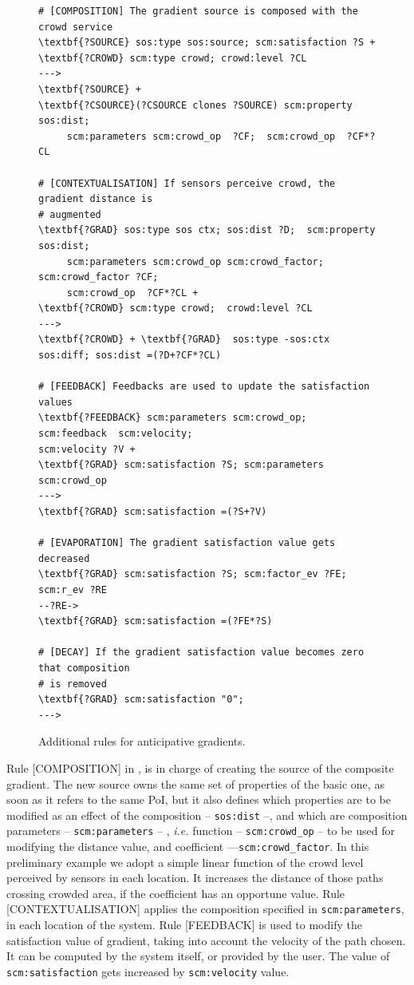 \documentclass[12pt,a4paper,twoside,openright]{book}
\begin{document}
\begin{figure}[t!]\vspace{10pt}
{\footnotesize \begin{Verbatim}[frame=single, commandchars=\\\{\}, label={\small \bf Eco-laws for gradient contextualisation}]
# [COMPOSITION] The gradient source is composed with the crowd service
\textbf{?SOURCE} sos:type sos:source; scm:satisfaction ?S +
\textbf{?CROWD} scm:type crowd; crowd:level ?CL 
---> 
\textbf{?SOURCE} +
\textbf{?CSOURCE}(?CSOURCE clones ?SOURCE) scm:property sos:dist;
     scm:parameters scm:crowd_op  ?CF;  scm:crowd_op  ?CF*?CL

# [CONTEXTUALISATION] If sensors perceive crowd, the gradient distance is
# augmented
\textbf{?GRAD} sos:type sos ctx; sos:dist ?D;  scm:property sos:dist; 
     scm:parameters scm:crowd_op scm:crowd_factor; scm:crowd_factor ?CF;
     scm:crowd_op  ?CF*?CL +
\textbf{?CROWD} scm:type crowd;  crowd:level ?CL 
--->
\textbf{?CROWD} + \textbf{?GRAD}  sos:type -sos:ctx sos:diff; sos:dist =(?D+?CF*?CL)

# [FEEDBACK] Feedbacks are used to update the satisfaction values
\textbf{?FEEDBACK} scm:parameters scm:crowd_op; scm:feedback  scm:velocity;
scm:velocity ?V +
\textbf{?GRAD} scm:satisfaction ?S; scm:parameters scm:crowd_op 
--->
\textbf{?GRAD} scm:satisfaction =(?S+?V)

# [EVAPORATION] The gradient satisfaction value gets decreased
\textbf{?GRAD} scm:satisfaction ?S; scm:factor_ev ?FE; scm:r_ev ?RE
--?RE->
\textbf{?GRAD} scm:satisfaction =(?FE*?S)

# [DECAY] If the gradient satisfaction value becomes zero that composition
# is removed
\textbf{?GRAD} scm:satisfaction "0"; 
--->

\end{Verbatim}
}
\vspace{-10pt}\caption{Additional rules for anticipative gradients.}\label{laws:crowd}
\end{figure}

%
Rule [COMPOSITION] in , is in charge of creating the source of the composite gradient. The new source owns the same set of properties of the basic one, as soon as it refers to the same PoI, but it also defines which properties are to be modified as an effect of the composition  -- \texttt{sos:dist} --, and which are composition parameters -- \texttt{scm:parameters} -- , \emph{i.e.}  function -- \texttt{scm:crowd\_op} -- to be used for modifying the distance value, and coefficient ---\texttt{scm:crowd\_factor}. In this preliminary example we adopt a simple linear function of the crowd level perceived by sensors in each location. It increases the distance of those paths crossing crowded area, if the coefficient has an opportune value.
%
Rule [CONTEXTUALISATION]  applies the composition specified in \texttt{scm:parameters}, in each location of the system.
%
Rule [FEEDBACK] is used to modify the satisfaction value of gradient, taking into account the velocity of the path chosen. It can be computed by the system itself, or provided by the user. The value of \texttt{scm:satisfaction} gets increased by \texttt{scm:velocity} value.
\end{document}
